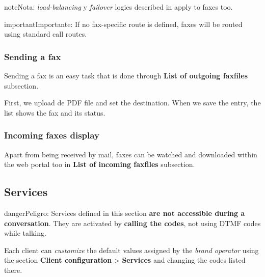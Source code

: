 \documentclass[letterpaper,10pt,spanish]{sphinxmanual}
\begin{document}
\begin{notice}{note}{Nota:}
\emph{load-balancing} y \emph{failover} logics described in {\hyperref[administration_portal/brand/routing/outgoing_routings:outgoing\string-routings]{}}
apply to faxes too.
\end{notice}

\begin{notice}{important}{Importante:}
If no fax-specific route is defined, faxes will be routed using
standard call routes.
\end{notice}


\subsubsection{Sending a fax}
\label{administration_portal/client/vpbx/faxes:sending-a-fax}
Sending a fax is an easy task that is done through \textbf{List of outgoing faxfiles} subsection.

First, we upload de PDF file and set the destination. When we save the entry, the list shows the fax and its status.


\subsubsection{Incoming faxes display}
\label{administration_portal/client/vpbx/faxes:incoming-faxes-display}
Apart from being received by mail, faxes can be watched and downloaded within
the web portal too in \textbf{List of incoming faxfiles} subsection.
\label{administration_portal/client/vpbx/services:client-services}

\subsection{Services}
\label{administration_portal/client/vpbx/services:services}\label{administration_portal/client/vpbx/services:client-services}\label{administration_portal/client/vpbx/services::doc}\label{administration_portal/client/vpbx/services:id1}
\begin{notice}{danger}{Peligro:}
Services defined in this section \textbf{are not accessible during a
conversation}. They are activated by \textbf{calling the codes}, not using
DTMF codes while talking.
\end{notice}

Each client can \emph{customize} the default values assigned by the \emph{brand operator}
using the section \textbf{Client configuration} \textgreater{} \textbf{Services} and changing the codes
listed there.
\end{document}

